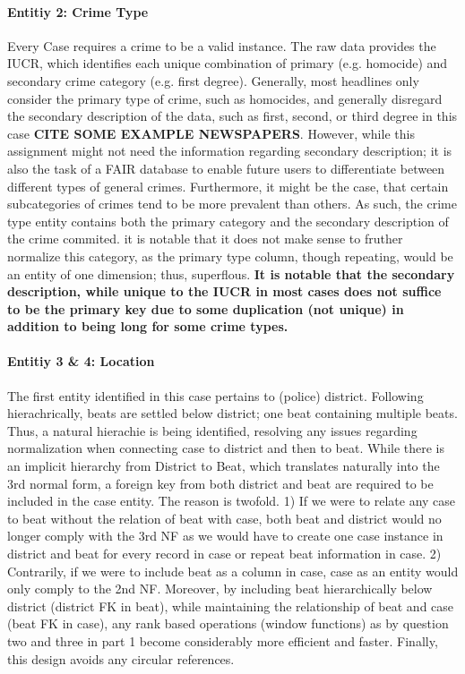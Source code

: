 \documentclass[a4paper]{article}
\begin{document}
\paragraph{Entitiy 2: Crime Type} Every Case requires a crime to be a valid instance. The raw data provides the IUCR, which identifies each unique combination of primary (e.g. homocide) and secondary crime category (e.g. first degree). Generally, most headlines only consider the primary type of crime, such as homocides, and generally disregard the secondary description of the data, such as first, second, or third degree in this case \textbf{CITE SOME EXAMPLE NEWSPAPERS}. However, while this assignment might not need the information regarding secondary description; it is also the task of a FAIR database to enable future users to differentiate between different types of general crimes. Furthermore, it might be the case, that certain subcategories of crimes tend to be more prevalent than others. As such, the crime type entity contains both the primary category and the secondary description of the crime commited. it is notable that it does not make sense to fruther normalize this category, as the primary type column, though repeating, would be an entity of one dimension; thus, superflous. \textbf{It is notable that the secondary description, while unique to the IUCR in most cases does not suffice to be the primary key due to some duplication (not unique) in addition to being long for some crime types.}


\paragraph{Entitiy 3 \& 4: Location} 
The first entity identified in this case pertains to (police) district. Following hierachrically, beats are settled below district; one beat containing multiple beats. 
Thus, a natural hierachie is being identified, resolving any issues regarding normalization when connecting case to district and then to beat. While there is an implicit hierarchy from District to Beat, which translates naturally into the 3rd normal form, a foreign key from both district and beat are required to be included in the case entity. The reason is twofold. 1) If we were to relate any case to beat without the relation of beat with case, both beat and district would no longer comply with the 3rd NF as we would have to create one case instance in district and beat for every record in case or repeat beat information in case. 2) Contrarily, if we were to include beat as a column in case, case as an entity would only comply to the 2nd NF. Moreover, by including beat hierarchically below district (district FK in beat), while maintaining the relationship of beat and case (beat FK in case), any rank based operations (window functions) as by question two and three in part 1 become considerably more efficient and faster. Finally, this design avoids any circular references.
\end{document}
